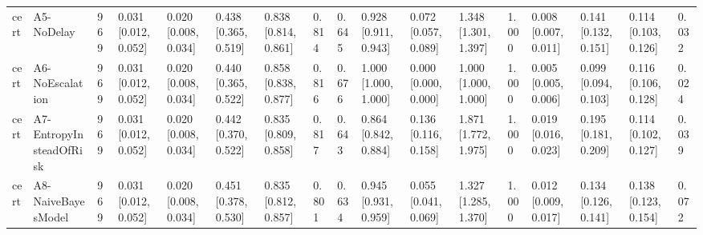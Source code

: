 \begin{table}[!ht]
{\begin{tabular}{lllllllllllllllll}
cert & A5-NoDelay & 969 & 0.031 [0.012, 0.052] & 0.020 [0.008, 0.034] & 0.438 [0.365, 0.519] & 0.838 [0.814, 0.861] & 0.814 & 0.645 & 0.928 [0.911, 0.943] & 0.072 [0.057, 0.089] & 1.348 [1.301, 1.397] & 1.000 & 0.008 [0.007, 0.011] & 0.141 [0.132, 0.151] & 0.114 [0.103, 0.126] & 0.032 \\
cert & A6-NoEscalation & 969 & 0.031 [0.012, 0.052] & 0.020 [0.008, 0.034] & 0.440 [0.365, 0.522] & 0.858 [0.838, 0.877] & 0.816 & 0.676 & 1.000 [1.000, 1.000] & 0.000 [0.000, 0.000] & 1.000 [1.000, 1.000] & 1.000 & 0.005 [0.005, 0.006] & 0.099 [0.094, 0.103] & 0.116 [0.106, 0.128] & 0.024 \\
cert & A7-EntropyInsteadOfRisk & 969 & 0.031 [0.012, 0.052] & 0.020 [0.008, 0.034] & 0.442 [0.370, 0.522] & 0.835 [0.809, 0.858] & 0.817 & 0.643 & 0.864 [0.842, 0.884] & 0.136 [0.116, 0.158] & 1.871 [1.772, 1.975] & 1.000 & 0.019 [0.016, 0.023] & 0.195 [0.181, 0.209] & 0.114 [0.102, 0.127] & 0.039 \\
cert & A8-NaiveBayesModel & 969 & 0.031 [0.012, 0.052] & 0.020 [0.008, 0.034] & 0.451 [0.378, 0.530] & 0.835 [0.812, 0.857] & 0.801 & 0.634 & 0.945 [0.931, 0.959] & 0.055 [0.041, 0.069] & 1.327 [1.285, 1.370] & 1.000 & 0.012 [0.009, 0.017] & 0.134 [0.126, 0.141] & 0.138 [0.123, 0.154] & 0.072 \\
\bottomrule
\end{tabular}}
\end{table}

